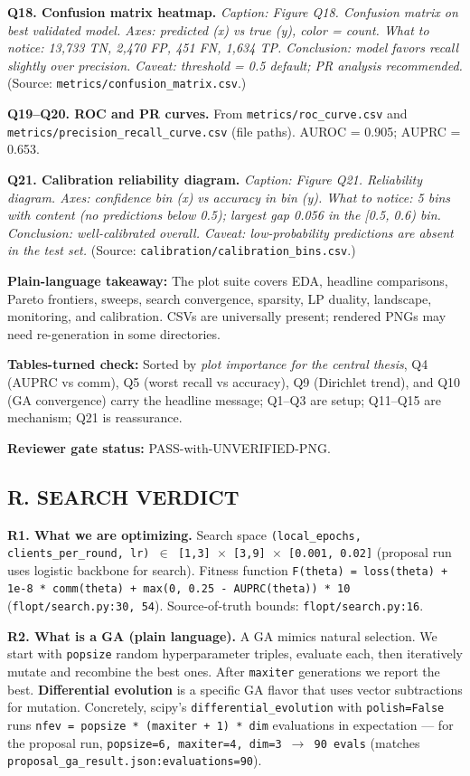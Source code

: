 \documentclass{article}
\begin{document}
\textbf{Q18. Confusion matrix heatmap.} \emph{Caption: Figure Q18. Confusion matrix on best validated model. Axes: predicted (x) vs true (y), color = count. What to notice: 13,733 TN, 2,470 FP, 451 FN, 1,634 TP. Conclusion: model favors recall slightly over precision. Caveat: threshold = 0.5 default; PR analysis recommended.} (Source: \texttt{metrics/confusion\_matrix.csv}.)


\textbf{Q19--Q20. ROC and PR curves.} From \texttt{metrics/roc\_curve.csv} and \texttt{metrics/precision\_recall\_curve.csv} (file paths). AUROC = 0.905; AUPRC = 0.653.


\textbf{Q21. Calibration reliability diagram.} \emph{Caption: Figure Q21. Reliability diagram. Axes: confidence bin (x) vs accuracy in bin (y). What to notice: 5 bins with content (no predictions below 0.5); largest gap 0.056 in the [0.5, 0.6) bin. Conclusion: well-calibrated overall. Caveat: low-probability predictions are absent in the test set.} (Source: \texttt{calibration/calibration\_bins.csv}.)


\textbf{Plain-language takeaway:} The plot suite covers EDA, headline comparisons, Pareto frontiers, sweeps, search convergence, sparsity, LP duality, landscape, monitoring, and calibration. CSVs are universally present; rendered PNGs may need re-generation in some directories.


\textbf{Tables-turned check:} Sorted by \emph{plot importance for the central thesis}, Q4 (AUPRC vs comm), Q5 (worst recall vs accuracy), Q9 (Dirichlet trend), and Q10 (GA convergence) carry the headline message; Q1--Q3 are setup; Q11--Q15 are mechanism; Q21 is reassurance.


\textbf{Reviewer gate status:} PASS-with-UNVERIFIED-PNG.


\subsection{R. SEARCH VERDICT}


\textbf{R1. What we are optimizing.} Search space \texttt{(local\_epochs, clients\_per\_round, lr) \ensuremath{\in} [1,3] \ensuremath{\times} [3,9] \ensuremath{\times} [0.001, 0.02]} (proposal run uses logistic backbone for search). Fitness function \texttt{F(theta) = loss(theta) + 1e-8 * comm(theta) + max(0, 0.25 - AUPRC(theta)) * 10} (\texttt{flopt/search.py:30, 54}). Source-of-truth bounds: \texttt{flopt/search.py:16}.


\textbf{R2. What is a GA (plain language).} A GA mimics natural selection. We start with \texttt{popsize} random hyperparameter triples, evaluate each, then iteratively mutate and recombine the best ones. After \texttt{maxiter} generations we report the best. \textbf{Differential evolution} is a specific GA flavor that uses vector subtractions for mutation. Concretely, scipy's \texttt{differential\_evolution} with \texttt{polish=False} runs \texttt{nfev = popsize * (maxiter + 1) * dim} evaluations in expectation --- for the proposal run, \texttt{popsize=6, maxiter=4, dim=3 \ensuremath{\rightarrow} 90 evals} (matches \texttt{proposal\_ga\_result.json:evaluations=90}).
\end{document}
